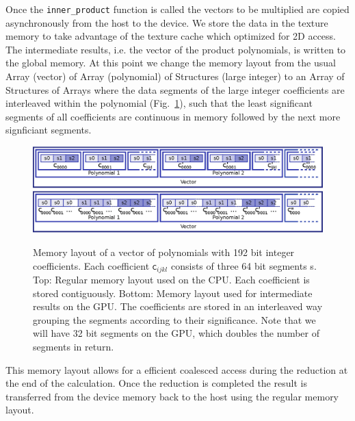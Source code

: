 \documentclass[oribibl,a4paper]{llncs2e/llncs}
\begin{document}
Once the \verb|inner_product| function is called the vectors to be multiplied are copied asynchronously from the host to the device.
We store the data in the texture memory to take advantage of the texture cache which optimized for 2D access.
The intermediate results, i.e. the vector of the product polynomials, is written to the global memory.
At this point we change the memory layout from the usual Array (vector) of Array (polynomial) of Structures (large integer) to an Array of Structures of Arrays where the data segments of the large integer coefficients are interleaved within the polynomial (Fig.\ \ref{fig:GPU_data_layout}), such that the least significant segments of all coefficients are continuous in memory followed by the next more signficiant segments.
\begin{figure}[t]
    \centering
\includegraphics[scale=0.9]{memory_layout.eps} \\
    \vspace{0.5cm}
\includegraphics[scale=0.9]{memory_layout_gpu.eps} 
    \caption{Memory layout of a vector of polynomials with 192 bit integer coefficients.
             Each coefficient $\textsf{c}_{ijkl}$ consists of three 64 bit segments \textsf{s}.
             Top: Regular memory layout used on the CPU. Each coefficient is stored contiguously.
             Bottom: Memory layout used for intermediate results on the GPU. The coefficients are stored in an interleaved way grouping the segments according to their significance.
             Note that we will have 32 bit segments on the GPU, which doubles the number of segments in return.
    }
    \label{fig:GPU_data_layout}
\end{figure}
This memory layout allows for a efficient coalesced access during the reduction at the end of the calculation.
Once the reduction is completed the result is transferred from the device memory back to the host using the regular memory layout.
\end{document}
